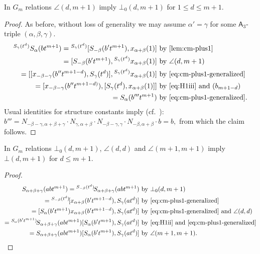 \begin{lemma} \label{claim2} In $G_m$ relations $\angle(d, m+1)$ imply $\bot_0(d, m+1)$ for  $1\leq d\leq m+1$. \end{lemma}
\begin{proof}
As before, without loss of generality we may assume $\alpha' = \gamma$ for some $\mathsf{A}_3$-triple $(\alpha, \beta, \gamma)$.
 \begin{align*}
 {}^{S_\gamma(t^d)}S_\alpha(bt^{m+1}) = {}^{S_\gamma(t^d)}[S_{-\beta}(b't^{m+1}), x_{\alpha+\beta}(1)] & \text{ by~\cref{lem:cm-plus1}}\\
 = [S_{-\beta}(b't^{m+1}), {}^{S_\gamma(t^d)}x_{\alpha+\beta}(1)]                                     
 & \text{ by $\angle(d, m+1)$}\\
 = [[x_{-\beta-\gamma}(b''t^{m+1-d}), S_\gamma(t^d)], {}^{S_\gamma(t^d)}x_{\alpha+\beta}(1)]          
 & \text{ by~\eqref{eq:cm-plus1-generalized}}\\
 = [x_{-\beta-\gamma}(b''t^{m+1-d)}), [S_\gamma(t^d), x_{\alpha+\beta}(1)]]                           
 & \text{ by~\eqref{eq:H1iii} and $(b_{m+1-d})$}\\
 = S_{\alpha}(b'''t^{m+1})                                                                            
 & \text{ by~\eqref{eq:cm-plus1-generalized}.} \end{align*}
Usual identities for structure constants imply (cf.~\cite[p.~12]{Re75}):
 $b'''=N_{-\beta-\gamma, \alpha+\beta+\gamma} \cdot N_{\gamma, \alpha+\beta} \cdot N_{-\beta-\gamma, \gamma} \cdot N_{-\beta, \alpha+\beta} \cdot b = b,$ from which the claim follows.
\end{proof}

\begin{lemma} \label{claim3}
 In $G_m$ relations $\bot_0(d, m+1)$, $\angle(d, d)$ and $\angle(m+1, m+1)$ imply $\bot(d, m+1)$ for $d\leq m+1$.
\end{lemma}
\begin{proof}
 \begin{align*} 
 S_{\alpha+\beta+\gamma}(abt^{m+1}) = {}^{S_{-\beta}(t^d)}\!S_{\alpha+\beta+\gamma}(abt^{m+1}) 
 & \text{ by $\bot_0(d, m+1)$}\\
 = {}^{S_{-\beta}(t^d)}\![x_{\alpha+\beta}(b't^{m+1-d}), S_\gamma(at^d)] 
 & \text{ by~\eqref{eq:cm-plus1-generalized}} \\
 = [S_{\alpha}(b't^{m+1}) x_{\alpha+\beta}(b't^{m+1-d}), S_\gamma(at^d)] 
 & \text{ by~\eqref{eq:cm-plus1-generalized} and $\angle(d, d)$ }\\
 = {}^{S_{\alpha}(b't^{m+1})}\!S_{\alpha+\beta+\gamma}(abt^{m+1}) [S_{\alpha}(b't^{m+1}), S_\gamma(at^d)] 
 & \text{ by~\eqref{eq:H1ii} and~\eqref{eq:cm-plus1-generalized}} \\
 = S_{\alpha+\beta+\gamma}(abt^{m+1}) [S_{\alpha}(b't^{m+1}), S_\gamma(at^d)] 
 & \text{ by $\angle(m+1, m+1)$. \qedhere}
\end{align*}
\end{proof}

